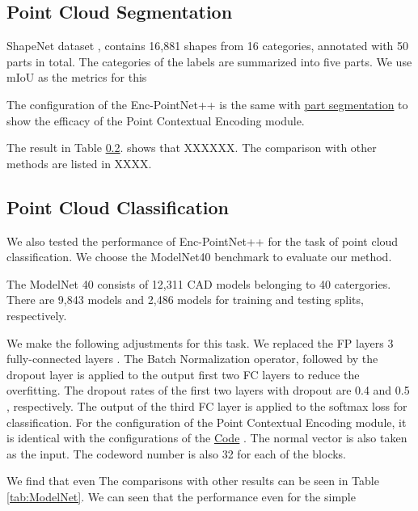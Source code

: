 \documentclass[runningheads]{llncs}
\begin{document}
\subsection{Point Cloud Segmentation}
ShapeNet  dataset \cite{}, contains 16,881 shapes from 16 categories, annotated with 50 parts in total. The  categories of the labels are summarized into five parts.  We use mIoU as the metrics for this 

 The configuration of the Enc-PointNet++ is the same with \href{https://github.com/yanx27/Pointnet_Pointnet2_pytorch/blob/master/models/pointnet2_part_seg_msg.py}{part segmentation} to show the efficacy of the Point Contextual Encoding module. 


The result in Table \ref{}. shows that XXXXXX. The comparison with other methods are  listed in XXXX.


\subsection{Point Cloud Classification}

We also tested the performance of Enc-PointNet++  for the task of point cloud classification. We choose the ModelNet40 benchmark to evaluate our method.

The  ModelNet 40 consists of 12,311 CAD models belonging to 40 catergories. There are 9,843 models and 2,486 models for training and testing splits, respectively. 

We make the following adjustments for this task. We replaced the FP layers 3 fully-connected layers . The Batch Normalization \cite{} operator, followed by the dropout layer is applied to the output first two FC layers to reduce the overfitting. The  dropout rates of the first two layers with dropout are 0.4 and 0.5 , respectively. The output of the third FC layer is applied to the softmax loss for classification. For the configuration of the Point Contextual Encoding module, it is identical with the configurations of the  \href{https://github.com/yanx27/Pointnet_Pointnet2_pytorch/blob/master/models/pointnet2_cls_msg.py}{Code} . The normal vector is also taken as the input. The codeword number is also 32 for each of the blocks.

We find that even 
The comparisons with other results can be seen in Table \ref{tab:ModelNet}. We can seen that the performance  even for the simple 
\end{document}
